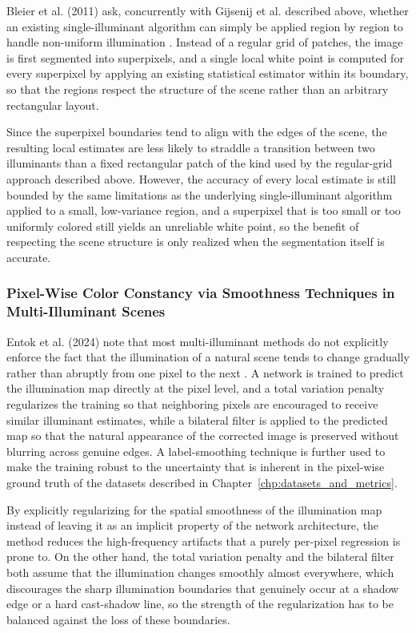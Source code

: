 Bleier et al. (2011) ask, concurrently with Gijsenij et al. described above, whether an existing single-illuminant algorithm can simply be applied region by region to handle non-uniform illumination \cite{bleierColorConstancyNonUniformIllumination}. Instead of a regular grid of patches, the image is first segmented into superpixels, and a single local white point is computed for every superpixel by applying an existing statistical estimator within its boundary, so that the regions respect the structure of the scene rather than an arbitrary rectangular layout.

Since the superpixel boundaries tend to align with the edges of the scene, the resulting local estimates are less likely to straddle a transition between two illuminants than a fixed rectangular patch of the kind used by the regular-grid approach described above. However, the accuracy of every local estimate is still bounded by the same limitations as the underlying single-illuminant algorithm applied to a small, low-variance region, and a superpixel that is too small or too uniformly colored still yields an unreliable white point, so the benefit of respecting the scene structure is only realized when the segmentation itself is accurate.

\subsubsection{Pixel-Wise Color Constancy via Smoothness Techniques in Multi-Illuminant Scenes}

Entok et al. (2024) note that most multi-illuminant methods do not explicitly enforce the fact that the illumination of a natural scene tends to change gradually rather than abruptly from one pixel to the next \cite{entok2024pixelwisecolorconstancysmoothness}. A network is trained to predict the illumination map directly at the pixel level, and a total variation penalty regularizes the training so that neighboring pixels are encouraged to receive similar illuminant estimates, while a bilateral filter is applied to the predicted map so that the natural appearance of the corrected image is preserved without blurring across genuine edges. A label-smoothing technique is further used to make the training robust to the uncertainty that is inherent in the pixel-wise ground truth of the datasets described in Chapter~\ref{chp:datasets_and_metrics}.

By explicitly regularizing for the spatial smoothness of the illumination map instead of leaving it as an implicit property of the network architecture, the method reduces the high-frequency artifacts that a purely per-pixel regression is prone to. On the other hand, the total variation penalty and the bilateral filter both assume that the illumination changes smoothly almost everywhere, which discourages the sharp illumination boundaries that genuinely occur at a shadow edge or a hard cast-shadow line, so the strength of the regularization has to be balanced against the loss of these boundaries.

